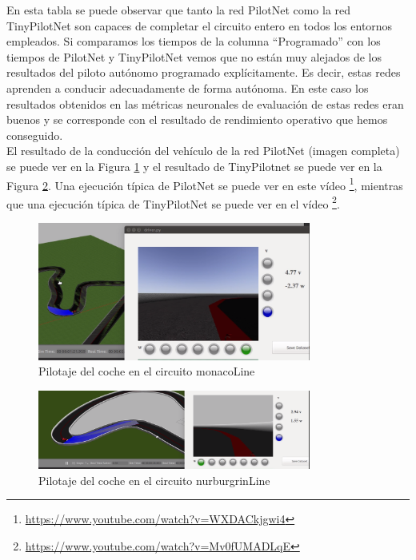 En esta tabla se puede observar que tanto la red PilotNet como la red TinyPilotNet son capaces de completar el circuito entero en todos los entornos empleados. Si comparamos los tiempos de la columna ``Programado'' con los tiempos de PilotNet y TinyPilotNet vemos que no están muy alejados de los resultados del piloto autónomo programado explícitamente. Es decir, estas redes aprenden a conducir adecuadamente de forma autónoma. En este caso los resultados obtenidos en las métricas neuronales de evaluación de estas redes eran buenos y se corresponde con el resultado de rendimiento operativo que hemos conseguido. \\

El resultado de la conducción del vehículo de la red PilotNet (imagen completa) se puede ver en la Figura \ref{fig.monaco_reg} y el resultado de TinyPilotnet se puede ver en la Figura \ref{fig.nurburgrin_reg}. Una ejecución típica de PilotNet se puede ver en este vídeo  \footnote{\url{https://www.youtube.com/watch?v=WXDACkjgwi4}}, mientras que una ejecución típica de TinyPilotNet se puede ver en el vídeo \footnote{\url{https://www.youtube.com/watch?v=Mv0fUMADLqE}}.\\

\begin{figure}[H]
\begin{center}
	\includegraphics[width=0.8\textwidth]{figures/Regresion/monaco_reg.png}
   \caption{Pilotaje del coche en el circuito monacoLine}
	\label{fig.monaco_reg}
\end{center}
\end{figure}

\begin{figure}[H]
\begin{center}
	\includegraphics[width=0.8\textwidth]{figures/Regresion/tinypilotnet_completa.png}
   \caption{Pilotaje del coche en el circuito nurburgrinLine}
	\label{fig.nurburgrin_reg}
\end{center}
\end{figure}




